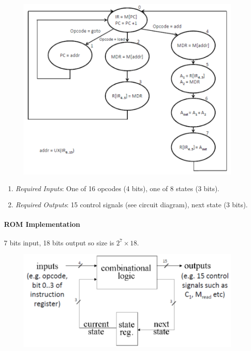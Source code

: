 \documentclass[twocolumn,english]{article}
\begin{document}
\begin{figure}[H]
\noindent \centering{}\includegraphics[scale=0.275]{img/microsteps}
\end{figure}

\begin{enumerate}
\item \emph{Required Inputs}: One of 16 opcodes (4 bits), one of 8 states
(3 bits).
\item \emph{Required Outputs}: 15 control signals (see circuit diagram),
next state (3 bits).
\end{enumerate}

\paragraph{ROM Implementation}

7 bits input, 18 bits output so size is $2^{7}\times18$.

\begin{figure}[H]
\noindent \centering{}\includegraphics[scale=0.325]{img/rom-implementation}
\end{figure}
\end{document}
